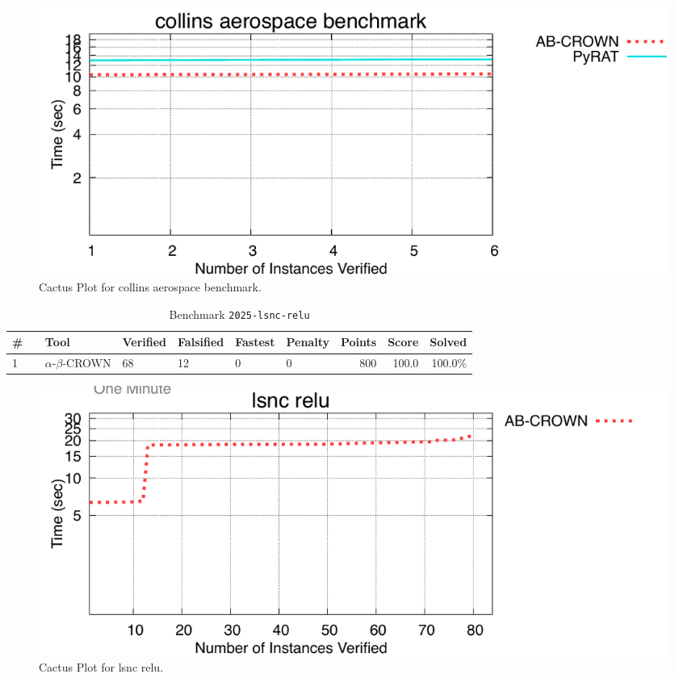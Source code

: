 \begin{figure}[h]
\centerline{\includegraphics[width=\textwidth]{cactus/2025_collins_aerospace_benchmark.pdf}}
\caption{Cactus Plot for collins aerospace benchmark.}
\label{fig:quantPic}
\end{figure}


\clearpage

\begin{table}[h]
\begin{center}
\caption{Benchmark \texttt{2025-lsnc-relu}} \label{tab:cat_2025_lsnc_relu}
{\setlength{\tabcolsep}{2pt}
\begin{tabular}[h]{@{}llllllrrr@{}}
\toprule
\textbf{\# ~} & \textbf{Tool} & \textbf{Verified} & \textbf{Falsified} & \textbf{Fastest} & \textbf{Penalty} & \textbf{Points} & \textbf{Score} & \textbf{Solved}\\
\midrule
1 & $\alpha$-$\beta$-CROWN & 68 & 12 & 0 & 0 & 800 & 100.0 & 100.0\% \\
\bottomrule
\end{tabular}
}
\end{center}
\end{table}



\begin{figure}[h]
\centerline{\includegraphics[width=\textwidth]{cactus/2025_lsnc_relu.pdf}}
\caption{Cactus Plot for lsnc relu.}
\label{fig:quantPic}
\end{figure}


